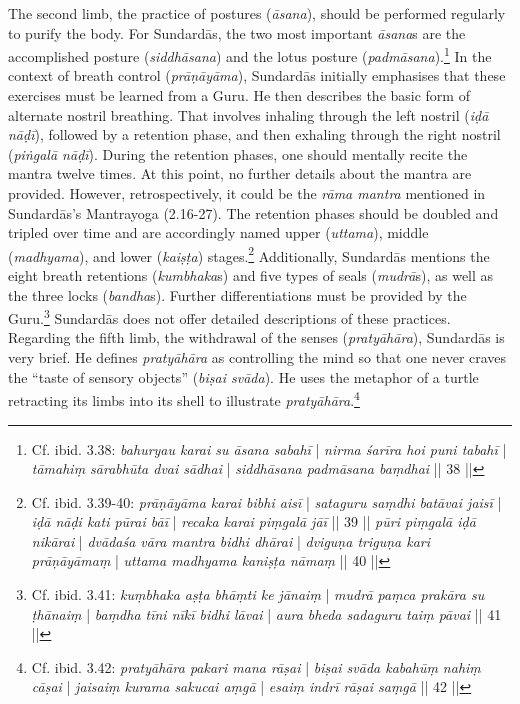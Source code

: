 The second limb, the practice of postures (\textit{āsana}), should be performed regularly to purify the body. For Sundardās, the two most important \textit{āsana}s are the accomplished posture (\textit{siddhāsana}) and the lotus posture (\textit{padmāsana}).\footnote{Cf. ibid. 3.38: \textit{bahuryau karai su āsana sabahī} | \textit{nirma śarīra hoi puni tabahī} | \textit{tāmahiṃ sārabhūta dvai sādhai} | \textit{siddhāsana padmāsana baṃdhai} || 38 ||}
In the context of breath control (\textit{prāṇāyāma}), Sundardās initially emphasises that these exercises must be learned from a Guru. He then describes the basic form of alternate nostril breathing. That involves inhaling through the left nostril (\textit{iḍā nāḍī}), followed by a retention phase, and then exhaling through the right nostril (\textit{piṅgalā nāḍī}). During the retention phases, one should mentally recite the mantra twelve times. At this point, no further details about the mantra are provided. However, retrospectively, it could be the \textit{rāma mantra} mentioned in Sundardās's Mantrayoga (2.16-27). The retention phases should be doubled and tripled over time and are accordingly named upper (\textit{uttama}), middle (\textit{madhyama}), and lower (\textit{kaiṣṭa}) stages.\footnote{Cf. ibid. 3.39-40: \textit{prāṇāyāma karai bibhi aisī} | \textit{sataguru saṃdhi batāvai jaisī} | \textit{iḍā nāḍi kati pūrai bāī} | \textit{recaka karai piṃgalā jāī} || 39 || \textit{pūri piṃgalā iḍā nikārai} | \textit{dvādaśa vāra mantra bidhi dhārai} | \textit{dviguṇa triguṇa kari prāṇāyāmaṃ} | \textit{uttama madhyama kaniṣṭa nāmaṃ} || 40 ||} Additionally, Sundardās mentions the eight breath retentions (\textit{kumbhaka}s) and five types of seals (\textit{mudrā}s), as well as the three locks (\textit{bandha}s). Further differentiations must be provided by the Guru.\footnote{Cf. ibid. 3.41: \textit{kuṃbhaka aṣṭa bhāṃti ke jānaiṃ} | \textit{mudrā paṃca prakāra su ṭhānaiṃ} | \textit{baṃdha tīni nīkī bidhi lāvai} | \textit{aura bheda sadaguru taiṃ pāvai} || 41 ||} Sundardās does not offer detailed descriptions of these practices.
Regarding the fifth limb, the withdrawal of the senses (\textit{pratyāhāra}), Sundardās is very brief. He defines \textit{pratyāhāra} as controlling the mind so that one never craves the ``taste of sensory objects'' (\textit{biṣai svāda}). He uses the metaphor of a turtle retracting its limbs into its shell to illustrate \textit{pratyāhāra}.\footnote{Cf. ibid. 3.42: \textit{pratyāhāra pakari mana rāṣai} | \textit{biṣai svāda kabahūṃ nahiṃ cāṣai} | \textit{jaisaiṃ kurama sakucai aṃgā} | \textit{esaiṃ indrī rāṣai saṃgā} || 42 ||}

